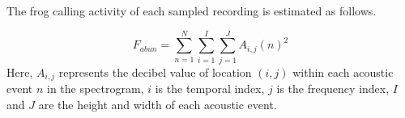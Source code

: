 



The frog calling activity of each sampled recording is estimated as follows.

\begin{equation}
F_{abun} = \sum_{n=1}^{N}\sum_{i=1}^{I}\sum_{j=1}^{J} A_{i,j}(n)^2
\end{equation}
Here, $A_{i,j}$ represents the decibel value of location $(i,j)$ within each acoustic event $n$ in the spectrogram, $i$ is the temporal index, $j$ is the frequency index, $I$ and $J$ are the height and width of each acoustic event.

